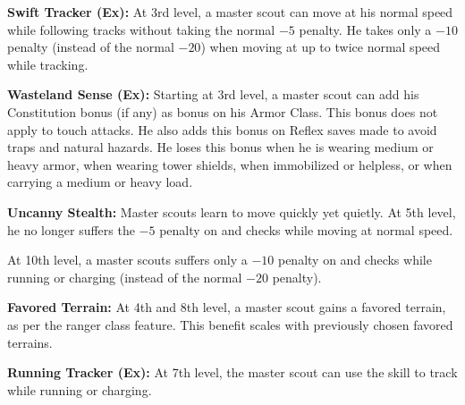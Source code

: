 {\textbf{Swift Tracker (Ex):} At 3rd level, a master scout can move at his normal speed while following tracks without taking the normal $-5$ penalty. He takes only a $-10$ penalty (instead of the normal $-20$) when moving at up to twice normal speed while tracking.

\textbf{Wasteland Sense (Ex):} Starting at 3rd level, a master scout can add his Constitution bonus (if any) as bonus on his Armor Class. This bonus does not apply to touch attacks. He also adds this bonus on Reflex saves made to avoid traps and natural hazards. He loses this bonus when he is wearing medium or heavy armor, when wearing tower shields, when immobilized or helpless, or when carrying a medium or heavy load.

\textbf{Uncanny Stealth:} Master scouts learn to move quickly yet quietly. At 5th level, he no longer suffers the $-5$ penalty on  and  checks while moving at normal speed.

At 10th level, a master scouts suffers only a $-10$ penalty on  and  checks while running or charging (instead of the normal $-20$ penalty).

\textbf{Favored Terrain:} At 4th and 8th level, a master scout gains a favored terrain, as per the ranger class feature. This benefit scales with previously chosen favored terrains.

\textbf{Running Tracker (Ex):} At 7th level, the master scout can use the  skill to track while running or charging.

}

